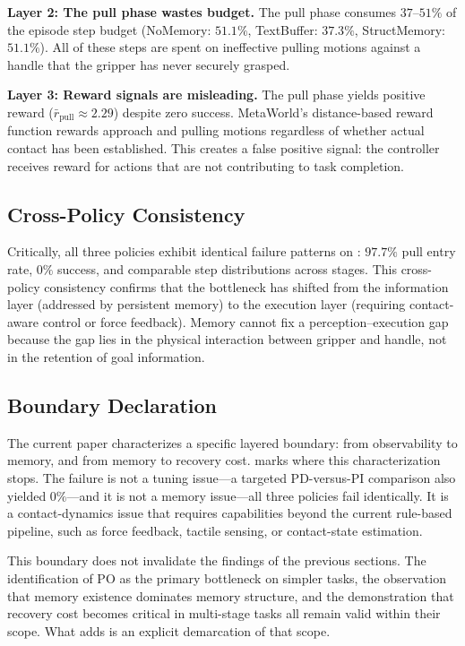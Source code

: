 \textbf{Layer 2: The pull phase wastes budget.}
The pull phase consumes $37$--$51\%$ of the episode step budget (NoMemory: $51.1\%$, TextBuffer: $37.3\%$, StructMemory: $51.1\%$). All of these steps are spent on ineffective pulling motions against a handle that the gripper has never securely grasped.

\textbf{Layer 3: Reward signals are misleading.}
The pull phase yields positive reward ($\bar{r}_{\text{pull}} \approx 2.29$) despite zero success. MetaWorld's distance-based reward function rewards approach and pulling motions regardless of whether actual contact has been established. This creates a false positive signal: the controller receives reward for actions that are not contributing to task completion.

\subsection{Cross-Policy Consistency}

Critically, all three policies exhibit identical failure patterns on : $97.7\%$ pull entry rate, $0\%$ success, and comparable step distributions across stages. This cross-policy consistency confirms that the bottleneck has shifted from the information layer (addressed by persistent memory) to the execution layer (requiring contact-aware control or force feedback). Memory cannot fix a perception--execution gap because the gap lies in the physical interaction between gripper and handle, not in the retention of goal information.

\subsection{Boundary Declaration}

The current paper characterizes a specific layered boundary: from observability to memory, and from memory to recovery cost.  marks where this characterization stops. The failure is not a tuning issue---a targeted PD-versus-PI comparison also yielded $0\%$---and it is not a memory issue---all three policies fail identically. It is a contact-dynamics issue that requires capabilities beyond the current rule-based pipeline, such as force feedback, tactile sensing, or contact-state estimation.

This boundary does not invalidate the findings of the previous sections. The identification of PO as the primary bottleneck on simpler tasks, the observation that memory existence dominates memory structure, and the demonstration that recovery cost becomes critical in multi-stage tasks all remain valid within their scope. What  adds is an explicit demarcation of that scope.

